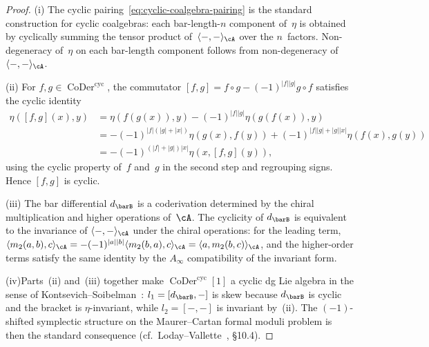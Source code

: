 \begin{proof}
(i)\enspace
The cyclic pairing~\eqref{eq:cyclic-coalgebra-pairing} is the
standard construction for cyclic coalgebras:
each bar-length-$n$ component of~$\eta$ is obtained by cyclically
summing the tensor product of~$\langle{-},{-}\rangle_{\cA}$ over
the $n$~factors.  Non-degeneracy of~$\eta$ on each bar-length
component follows from non-degeneracy
of~$\langle{-},{-}\rangle_{\cA}$.

(ii)\enspace
For $f,g\in\operatorname{CoDer}^{\mathrm{cyc}}$, the
commutator $[f,g] = f\circ g - (-1)^{|f||g|}g\circ f$ satisfies
the cyclic identity
\begin{align*}
\eta([f,g](x),y) &= \eta(f(g(x)),y) -
(-1)^{|f||g|}\eta(g(f(x)),y)\\
&= -(-1)^{|f|(|g|+|x|)}\eta(g(x),f(y))
  + (-1)^{|f||g|+|g||x|}\eta(f(x),g(y))\\
&= -(-1)^{(|f|+|g|)|x|}\eta(x,[f,g](y)),
\end{align*}
using the cyclic property of~$f$ and~$g$ in the second step and
regrouping signs.  Hence $[f,g]$ is cyclic.

(iii)\enspace
The bar differential $d_{\barB}$ is a coderivation determined by
the chiral multiplication and higher operations of~$\cA$.
The cyclicity of $d_{\barB}$ is equivalent to the invariance of
$\langle{-},{-}\rangle_{\cA}$ under the chiral operations:
for the leading term,
$\langle m_2(a,b),c\rangle_{\cA}
= -(-1)^{|a||b|}\langle m_2(b,a),c\rangle_{\cA}
= \langle a, m_2(b,c)\rangle_{\cA}$,
and the higher-order terms satisfy the same identity by the
$A_\infty$ compatibility of the invariant form.

(iv)\enspace Parts~(ii) and~(iii) together make
$\operatorname{CoDer}^{\mathrm{cyc}}[1]$ a cyclic dg Lie algebra
in the sense of Kontsevich--Soibelman~\cite{KontsevichSoibelman}:
$l_1 = [d_{\barB},-]$ is skew because $d_{\barB}$ is cyclic and
the bracket is $\eta$-invariant, while $l_2 = [-,-]$ is invariant
by~(ii).  The $(-1)$-shifted symplectic structure on the
Maurer--Cartan formal moduli problem is then the standard
consequence (cf.\ Loday--Vallette~\cite{LV12}, \S10.4).
\end{proof}

